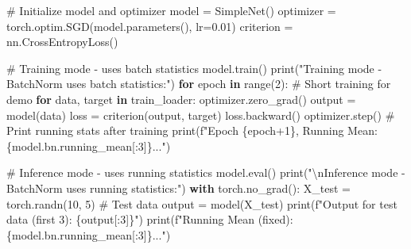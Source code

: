 \documentclass[
  letterpaper,
  DIV=11,
  numbers=noendperiod]{scrreprt}
\newenvironment{Shaded}{\begin{snugshade}}{\end{snugshade}}
\newcommand{\BuiltInTok}[1]{\textcolor[rgb]{0.00,0.23,0.31}{#1}}
\newcommand{\CharTok}[1]{\textcolor[rgb]{0.13,0.47,0.30}{#1}}
\newcommand{\CommentTok}[1]{\textcolor[rgb]{0.37,0.37,0.37}{#1}}
\newcommand{\ControlFlowTok}[1]{\textcolor[rgb]{0.00,0.23,0.31}{\textbf{#1}}}
\newcommand{\DecValTok}[1]{\textcolor[rgb]{0.68,0.00,0.00}{#1}}
\newcommand{\FloatTok}[1]{\textcolor[rgb]{0.68,0.00,0.00}{#1}}
\newcommand{\KeywordTok}[1]{\textcolor[rgb]{0.00,0.23,0.31}{\textbf{#1}}}
\newcommand{\NormalTok}[1]{\textcolor[rgb]{0.00,0.23,0.31}{#1}}
\newcommand{\OperatorTok}[1]{\textcolor[rgb]{0.37,0.37,0.37}{#1}}
\newcommand{\SpecialCharTok}[1]{\textcolor[rgb]{0.37,0.37,0.37}{#1}}
\newcommand{\SpecialStringTok}[1]{\textcolor[rgb]{0.13,0.47,0.30}{#1}}
\newcommand{\StringTok}[1]{\textcolor[rgb]{0.13,0.47,0.30}{#1}}
\begin{document}
\begin{Shaded}
\begin{Highlighting}[]
\CommentTok{\# Initialize model and optimizer}
\NormalTok{model }\OperatorTok{=}\NormalTok{ SimpleNet()}
\NormalTok{optimizer }\OperatorTok{=}\NormalTok{ torch.optim.SGD(model.parameters(), lr}\OperatorTok{=}\FloatTok{0.01}\NormalTok{)}
\NormalTok{criterion }\OperatorTok{=}\NormalTok{ nn.CrossEntropyLoss()}

\CommentTok{\# Training mode {-} uses batch statistics}
\NormalTok{model.train()}
\BuiltInTok{print}\NormalTok{(}\StringTok{"Training mode {-} BatchNorm uses batch statistics:"}\NormalTok{)}
\ControlFlowTok{for}\NormalTok{ epoch }\KeywordTok{in} \BuiltInTok{range}\NormalTok{(}\DecValTok{2}\NormalTok{):  }\CommentTok{\# Short training for demo}
    \ControlFlowTok{for}\NormalTok{ data, target }\KeywordTok{in}\NormalTok{ train\_loader:}
\NormalTok{        optimizer.zero\_grad()}
\NormalTok{        output }\OperatorTok{=}\NormalTok{ model(data)}
\NormalTok{        loss }\OperatorTok{=}\NormalTok{ criterion(output, target)}
\NormalTok{        loss.backward()}
\NormalTok{        optimizer.step()}
    \CommentTok{\# Print running stats after training}
    \BuiltInTok{print}\NormalTok{(}\SpecialStringTok{f"Epoch }\SpecialCharTok{\{}\NormalTok{epoch}\OperatorTok{+}\DecValTok{1}\SpecialCharTok{\}}\SpecialStringTok{, Running Mean: }\SpecialCharTok{\{}\NormalTok{model}\SpecialCharTok{.}\NormalTok{bn}\SpecialCharTok{.}\NormalTok{running\_mean[:}\DecValTok{3}\NormalTok{]}\SpecialCharTok{\}}\SpecialStringTok{..."}\NormalTok{)}

\CommentTok{\# Inference mode {-} uses running statistics}
\NormalTok{model.}\BuiltInTok{eval}\NormalTok{()}
\BuiltInTok{print}\NormalTok{(}\StringTok{"}\CharTok{\textbackslash{}n}\StringTok{Inference mode {-} BatchNorm uses running statistics:"}\NormalTok{)}
\ControlFlowTok{with}\NormalTok{ torch.no\_grad():}
\NormalTok{    X\_test }\OperatorTok{=}\NormalTok{ torch.randn(}\DecValTok{10}\NormalTok{, }\DecValTok{5}\NormalTok{)  }\CommentTok{\# Test data}
\NormalTok{    output }\OperatorTok{=}\NormalTok{ model(X\_test)}
    \BuiltInTok{print}\NormalTok{(}\SpecialStringTok{f"Output for test data (first 3): }\SpecialCharTok{\{}\NormalTok{output[:}\DecValTok{3}\NormalTok{]}\SpecialCharTok{\}}\SpecialStringTok{"}\NormalTok{)}
    \BuiltInTok{print}\NormalTok{(}\SpecialStringTok{f"Running Mean (fixed): }\SpecialCharTok{\{}\NormalTok{model}\SpecialCharTok{.}\NormalTok{bn}\SpecialCharTok{.}\NormalTok{running\_mean[:}\DecValTok{3}\NormalTok{]}\SpecialCharTok{\}}\SpecialStringTok{..."}\NormalTok{)}
\end{Highlighting}
\end{Shaded}
\end{document}
